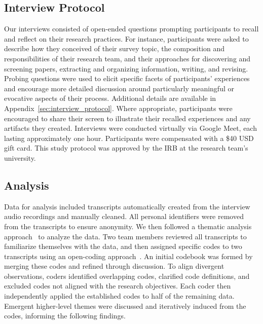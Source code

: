 \subsection{Interview Protocol}
Our interviews consisted of open-ended questions prompting participants to recall and reflect on their research practices. For instance, participants were asked to describe how they conceived of their survey topic, the composition and responsibilities of their research team, and their approaches for discovering and screening papers, extracting and organizing information, writing, and revising. Probing questions were used to elicit specific facets of participants' experiences and encourage more detailed discussion around particularly meaningful or evocative aspects of their process. Additional details are available in Appendix~\ref{sec:interview_protocol}. Where appropriate, participants were encouraged to share their screen to illustrate their recalled experiences and any artifacts they created. Interviews were conducted virtually via Google Meet, each lasting approximately one hour. Participants were compensated with a \$40 USD gift card. This study protocol was approved by the IRB at the research team's university.

\subsection{Analysis}
Data for analysis included transcripts automatically created from the interview audio recordings and manually cleaned. All personal identifiers were removed from the transcripts to ensure anonymity. We then followed a thematic analysis approach~\cite{braun_thematicAnalysis_2006} to analyze the data. Two team members reviewed all transcripts to familiarize themselves with the data, and then assigned specific codes to two transcripts using an open-coding approach~\cite[Chapter 8]{strauss1998basics}. An initial codebook was formed by merging these codes and refined through discussion. To align divergent observations, coders identified overlapping codes, clarified code definitions, and excluded codes not aligned with the research objectives. Each coder then independently applied the established codes to half of the remaining data. Emergent higher-level themes were discussed and iteratively induced from the codes, informing the following findings.
